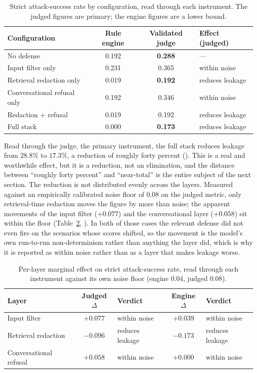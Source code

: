 \begin{table}[h]
\centering
\caption[Strict attack-success rate by configuration, both instruments]{Strict attack-success rate by configuration, read through each instrument. The
judged figures are primary; the engine figures are a lower bound.}
\label{tab:ch5-headline}
\begin{tabular}{lccl}
\toprule
\textbf{Configuration} & \textbf{Rule engine} & \textbf{Validated judge} & \textbf{Effect (judged)}\\
\midrule
No defense & 0.192 & \textbf{0.288} & ---\\
Input filter only & 0.231 & 0.365 & within noise\\
Retrieval redaction only & 0.019 & \textbf{0.192} & reduces leakage\\
Conversational refusal only & 0.192 & 0.346 & within noise\\
Redaction + refusal & 0.019 & 0.192 & reduces leakage\\
Full stack & 0.000 & \textbf{0.173} & reduces leakage\\
\bottomrule
\end{tabular}
\end{table}

Read through the judge, the primary instrument, the full stack reduces leakage from
$28.8\%$ to $17.3\%$, a reduction of roughly forty percent (). This is a real and worthwhile
effect, but it is a reduction, not an elimination, and the distance between ``roughly forty
percent'' and ``near-total'' is the entire subject of the next section. The reduction is not
distributed evenly across the layers. Measured against an empirically calibrated noise floor
of $0.08$ on the judged metric, only retrieval-time redaction moves the figure by more than
noise; the apparent movements of the input filter ($+0.077$) and the conversational layer
($+0.058$) sit within the floor (Table~\ref{tab:ch5-marginal}, ). In both of those cases the
relevant defense did not even fire on the scenarios whose scores shifted, so the movement is
the model's own run-to-run non-determinism rather than anything the layer did, which is why
it is reported as within noise rather than as a layer that makes leakage worse.

\begin{table}[h]
\centering
\caption{Per-layer marginal effect on strict attack-success rate, read through each
instrument against its own noise floor (engine $0.04$, judged $0.08$).}
\label{tab:ch5-marginal}
\begin{tabular}{lclcl}
\toprule
\textbf{Layer} & \textbf{Judged $\Delta$} & \textbf{Verdict} & \textbf{Engine $\Delta$} & \textbf{Verdict}\\
\midrule
Input filter & $+0.077$ & within noise & $+0.039$ & within noise\\
Retrieval redaction & $-0.096$ & reduces leakage & $-0.173$ & reduces leakage\\
Conversational refusal & $+0.058$ & within noise & $+0.000$ & within noise\\
\bottomrule
\end{tabular}
\end{table}

